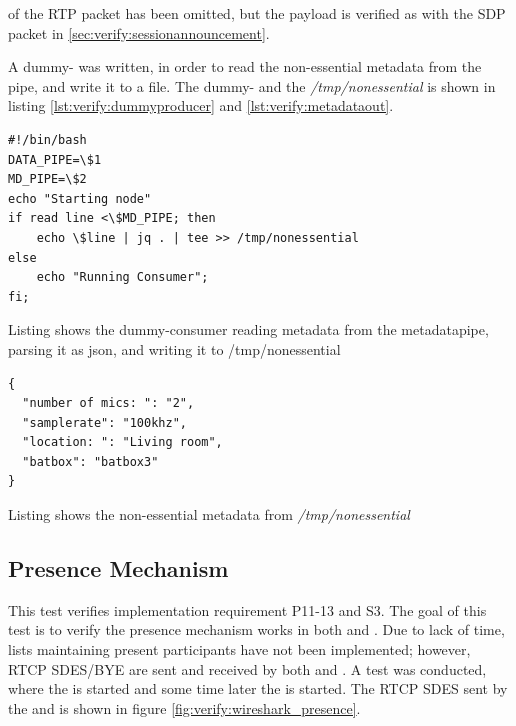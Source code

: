  of the RTP packet has been omitted, but the payload is verified as with the SDP packet in \ref{sec:verify:sessionannouncement}.

A dummy-\con{} was written, in order to read the non-essential metadata from the pipe, and write it to a file. The dummy-\con{} and the \textit{/tmp/nonessential} is shown in listing \ref{lst:verify:dummyproducer} and \ref{lst:verify:metadataout}.


\begin{listing}[H] 
\begin{verbatim}
#!/bin/bash
DATA_PIPE=\$1
MD_PIPE=\$2
echo "Starting node"
if read line <\$MD_PIPE; then
	echo \$line | jq . | tee >> /tmp/nonessential
else
	echo "Running Consumer";
fi;  
\end{verbatim}
\caption{Listing shows the dummy-consumer reading metadata from the metadatapipe, parsing it as json, and writing it to /tmp/nonessential}
\label{lst:verify:dummyproducer}
\end{listing}



\begin{listing}[H] 
\begin{verbatim}
{
  "number of mics: ": "2",
  "samplerate": "100khz",
  "location: ": "Living room",
  "batbox": "batbox3"
} 
\end{verbatim}
\caption{Listing shows the non-essential metadata from \textit{/tmp/nonessential}}
\label{lst:verify:nonessentialmetadata}
\end{listing}

\subsection{Presence Mechanism} \label{sec:verify:presencemechanism}
This test verifies implementation requirement P11-13 and S3. The goal of this test is to verify the presence mechanism works in both \sub{} and \pub{}. Due to lack of time, lists maintaining present participants have not been implemented; however, RTCP SDES/BYE are sent and received by both \pub{} and \sub{}.
A test was conducted, where the \pub{} is started and some time later the \sub{} is started. The RTCP SDES sent by the \pub{} and \sub{} is shown in figure \ref{fig:verify:wireshark_presence}.

